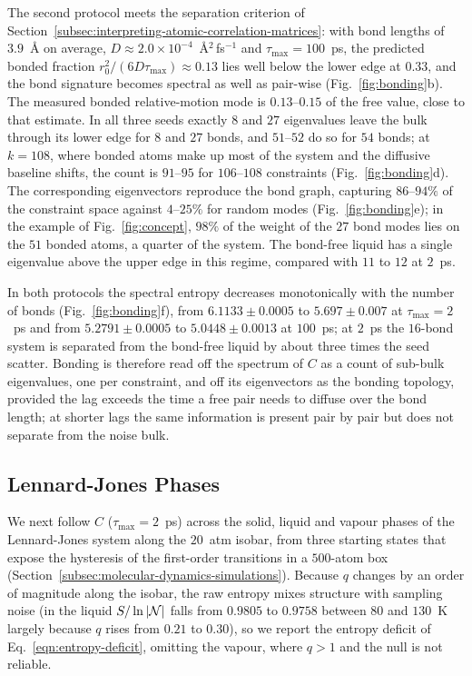 The second protocol meets the separation criterion of Section~\ref{subsec:interpreting-atomic-correlation-matrices}: with bond lengths of $3.9$~\AA{} on average, $D \approx 2.0 \times 10^{-4}$~\AA$^{2}$\,fs$^{-1}$ and $\tau_{\max} = 100$~ps, the predicted bonded fraction $r_{0}^{2}/(6D\tau_{\max}) \approx 0.13$ lies well below the lower edge at $0.33$, and the bond signature becomes spectral as well as pair-wise (Fig.~\ref{fig:bonding}b).
The measured bonded relative-motion mode is $0.13$--$0.15$ of the free value, close to that estimate.
In all three seeds exactly $8$ and $27$ eigenvalues leave the bulk through its lower edge for $8$ and $27$ bonds, and $51$--$52$ do so for $54$ bonds; at $k = 108$, where bonded atoms make up most of the system and the diffusive baseline shifts, the count is $91$--$95$ for $106$--$108$ constraints (Fig.~\ref{fig:bonding}d).
The corresponding eigenvectors reproduce the bond graph, capturing $86$--$94\%$ of the constraint space against $4$--$25\%$ for random modes (Fig.~\ref{fig:bonding}e); in the example of Fig.~\ref{fig:concept}, $98\%$ of the weight of the $27$ bond modes lies on the $51$ bonded atoms, a quarter of the system.
The bond-free liquid has a single eigenvalue above the upper edge in this regime, compared with $11$ to $12$ at $2$~ps.

In both protocols the spectral entropy decreases monotonically with the number of bonds (Fig.~\ref{fig:bonding}f), from $6.1133 \pm 0.0005$ to $5.697 \pm 0.007$ at $\tau_{\max} = 2$~ps and from $5.2791 \pm 0.0005$ to $5.0448 \pm 0.0013$ at $100$~ps; at $2$~ps the $16$-bond system is separated from the bond-free liquid by about three times the seed scatter.
Bonding is therefore read off the spectrum of $C$ as a count of sub-bulk eigenvalues, one per constraint, and off its eigenvectors as the bonding topology, provided the lag exceeds the time a free pair needs to diffuse over the bond length; at shorter lags the same information is present pair by pair but does not separate from the noise bulk.

\subsection{Lennard-Jones Phases}
\label{subsec:lennard-jones-phases}
We next follow $C$ ($\tau_{\max} = 2$~ps) across the solid, liquid and vapour phases of the Lennard-Jones system along the $20$~atm isobar, from three starting states that expose the hysteresis of the first-order transitions in a $500$-atom box (Section~\ref{subsec:molecular-dynamics-simulations}).
Because $q$ changes by an order of magnitude along the isobar, the raw entropy mixes structure with sampling noise (in the liquid $S/\ln|\mathcal{N}|$ falls from $0.9805$ to $0.9758$ between $80$ and $130$~K largely because $q$ rises from $0.21$ to $0.30$), so we report the entropy deficit of Eq.~\eqref{eqn:entropy-deficit}, omitting the vapour, where $q > 1$ and the null is not reliable.

